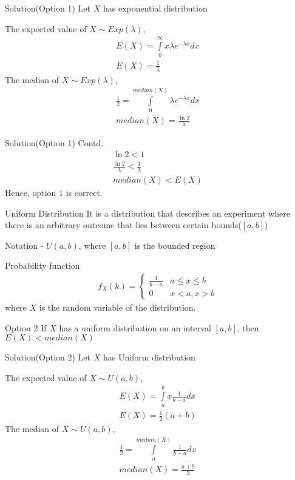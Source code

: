 \documentclass{beamer}
\begin{document}
\begin{frame}{Solution(Option 1)}
    Let $X$ has exponential distribution
    
    The expected value of $X \sim Exp(\lambda)$,
    \begin{align}
        E(X)=\int\limits_0^{\infty}x\lambda e^{-\lambda x}d x\\
        E(X)=\frac{1}{\lambda}
    \end{align}
    The median of $X \sim Exp(\lambda)$,
    \begin{align}
        \frac{1}{2}=\int\limits_0^{median(X)}\lambda e^{-\lambda x}d x\\
        median(X)=\frac{\ln{2}}{\lambda}
    \end{align}
\end{frame}
\begin{frame}{Solution(Option 1) Contd.}
    \begin{align}
        \ln{2}<1\\
        \frac{\ln{2}}{\lambda}<\frac{1}{\lambda}\\
         median(X)<E(X)
    \end{align}
    Hence, option $1$ is correct.
\end{frame}
\begin{frame}{}
    \begin{block}{Uniform Distribution}
     It is a distribution that describes an experiment where there is an arbitrary outcome that lies between certain bounds($[a,b]$)
    
    Notation - $U(a,b)$, where $[a,b]$ is the bounded region
    \end{block}
    \begin{block}{Probability function}
    \begin{align}
        f_X(k)=
        \begin{cases}
            \frac{1}{b-a} & a\leq x\leq b\\
            0 & x < a, x > b
        \end{cases}
    \end{align}
    where $X$ is the random variable of the distribution.
    \end{block}
\end{frame}
\begin{frame}{Option 2}
    If $X$ has a uniform distribution on an interval $[a,b]$, then $E(X)<median(X)$
\end{frame}
\begin{frame}{Solution(Option 2)}
    Let $X$ has Uniform distribution
    
    The expected value of $X \sim U(a,b)$,
    \begin{align}
        E(X)=\int\limits_a^{b}x\frac{1}{b-a}d x\\
        E(X)=\frac{1}{2}(a+b)
    \end{align}
    The median of $X \sim U(a,b)$,
    \begin{align}
        \frac{1}{2}=\int\limits_a^{median(X)}\frac{1}{b-a}d x\\
        median(X)=\frac{a+b}{2}
    \end{align}
\end{frame}
\end{document}
